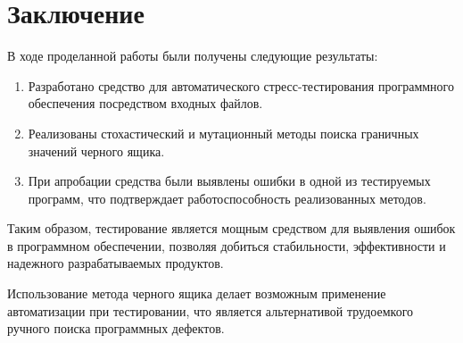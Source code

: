 \documentclass[a4paper,14pt,href]{article}
\begin{document}
\section*{Заключение}
	В ходе проделанной работы были получены следующие результаты:
\begin{enumerate}
\item Разработано средство для автоматического стресс-тестирования программного обеспечения посредством входных файлов.

\item Реализованы стохастический и мутационный методы поиска граничных значений черного ящика.

\item При апробации средства были выявлены ошибки в одной из тестируемых программ, что подтверждает работоспособность реализованных методов.      
\end{enumerate}       

	Таким образом, тестирование является мощным средством для выявления ошибок в программном обеспечении, позволяя добиться стабильности, эффективности и надежного разрабатываемых продуктов. 

Использование метода черного ящика делает возможным применение автоматизации при тестировании, что является альтернативой трудоемкого ручного поиска программных дефектов.  

\newpage
{}


 
\end{document}
